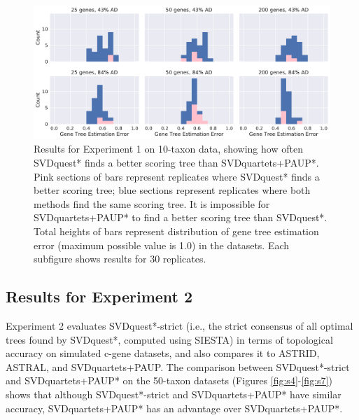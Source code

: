 \begin{figure}
  \centering
  \includegraphics[width=\textwidth]{svdquest-figs/svdquestplus_vs_paup_better_score_10tax.pdf}
\caption[Comparison of SVDquest* and SVDquartets+PAUP* with respect to MQSST scores on 10-taxon simulated data]{Results for Experiment 1 on 10-taxon data, showing how
    often SVDquest* finds a better scoring tree than SVDquartets+PAUP*. Pink
    sections of bars represent replicates where SVDquest* finds a
    better scoring tree; blue sections represent replicates where both
    methods find the same scoring tree. It is impossible for SVDquartets+PAUP* to
    find a better scoring tree than SVDquest*. Total heights of bars
    represent distribution of gene tree estimation error (maximum possible value is 1.0) in the
    datasets.  
      Each subfigure shows results for 30 replicates.   
    }\label{svdquest::fig:exp1_10}
\end{figure}


\clearpage
\subsection{Results for Experiment 2}

Experiment 2 evaluates  %
SVDquest*-strict (i.e., 
the strict consensus of all optimal trees found by SVDquest*, computed using SIESTA) 
in terms of topological accuracy 
on simulated c-gene datasets, and also compares it to ASTRID, ASTRAL, and SVDquartets+PAUP.  
{The comparison between SVDquest*-strict and SVDquartets+PAUP* on the 50-taxon datasets (Figures \ref{fig:s4}-\ref{fig:s7}) shows that although SVDquest*-strict and SVDquartets+PAUP* have similar accuracy, SVDquartets+PAUP* has an advantage over SVDquartets+PAUP*. }



